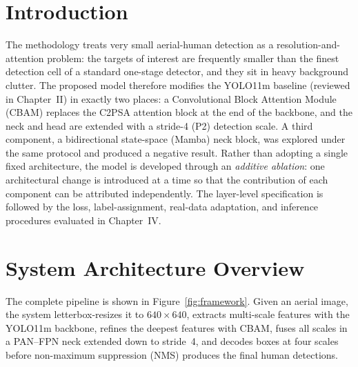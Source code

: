 \documentclass[12pt,a4paper,oneside]{report}
\begin{document}
\section{Introduction}
The methodology treats very small aerial-human detection as a
resolution-and-attention problem: the targets of
interest are frequently smaller than the finest detection cell of a standard
one-stage detector, and they sit in heavy background clutter. The proposed model
therefore modifies the YOLO11m baseline (reviewed in Chapter~II) in exactly two
places: a Convolutional Block Attention Module (CBAM) replaces the C2PSA attention
block at the end of the backbone, and the neck and head are extended with a
stride-4 (P2) detection scale. A third component, a bidirectional state-space
(Mamba) neck block, was explored under the same protocol and produced a negative
result. Rather than adopting a single fixed architecture, the model
is developed through an \emph{additive ablation}: one architectural change is
introduced at a time so that the contribution of each component can be attributed
independently. The layer-level specification is followed by the loss,
label-assignment, real-data adaptation, and inference procedures evaluated in
Chapter~IV.

\section{System Architecture Overview}
The complete pipeline is shown in Figure~\ref{fig:framework}. Given an aerial
image, the system letterbox-resizes it to $640 \times 640$, extracts multi-scale
features with the YOLO11m backbone, refines the deepest features with CBAM,
fuses all scales in a PAN--FPN neck extended down to stride~4, and decodes boxes
at four scales before non-maximum suppression (NMS) produces the final human
detections.
\end{document}
